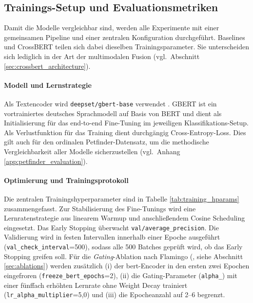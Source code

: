\subsection{Trainings-Setup und Evaluationsmetriken}
\label{sec:training_setup}

Damit die Modelle vergleichbar sind, werden alle Experimente mit einer gemeinsamen Pipeline und einer zentralen Konfiguration durchgeführt. Baselines und CrossBERT teilen sich dabei dieselben Trainingsparameter. Sie unterscheiden sich lediglich in der Art der multimodalen Fusion (vgl.\ Abschnitt \ref{sec:crossbert_architecture}).

\paragraph{Modell und Lernstrategie}
Als Textencoder wird \texttt{deepset/\allowbreak gbert-base} verwendet \allowbreak\cite{Chan2020GBERT}. GBERT ist ein vortrainiertes deutsches Sprachmodell auf Basis von BERT \cite{Devlin2019} und dient als Initialisierung für das end-to-end Fine-Tuning im jeweiligen Klassifikations-Setup. Als Verlustfunktion für das Training dient durchgängig Cross-Entropy-Loss. Dies gilt auch für den ordinalen Petfinder-Datensatz, um die methodische Vergleichbarkeit aller Modelle sicherzustellen (vgl.\ Anhang \ref{app:petfinder_evaluation}).

\paragraph{Optimierung und Trainingsprotokoll}
Die zentralen Trainingshyperparameter sind in Tabelle \ref{tab:training_hparams} zusammengefasst. Zur Stabilisierung des Fine-Tunings wird eine Lernratenstrategie aus linearem Warmup und anschließendem Cosine Scheduling eingesetzt. Das Early Stopping überwacht \texttt{val/average\_\allowbreak precision}. Die Validierung wird in festen Intervallen innerhalb einer Epoche ausgeführt (\texttt{val\_\allowbreak check\_\allowbreak interval}=500), sodass alle 500 Batches geprüft wird, ob das Early Stopping greifen soll. 
Für die \emph{Gating}-Ablation nach Flamingo (\cite{Alayrac2022}, siehe Abschnitt \ref{sec:ablations}) werden zusätzlich (i) der \gls{bert}-Encoder in den ersten zwei Epochen eingefroren (\texttt{freeze\_bert\_epochs}=2), (ii) die Gating-Parameter (\texttt{alpha\_}) mit einer fünffach erhöhten Lernrate ohne Weight Decay trainiert (\texttt{lr\_alpha\_multiplier}=5{,}0) und (iii) die Epocheanzahl auf 2--6 begrenzt.

